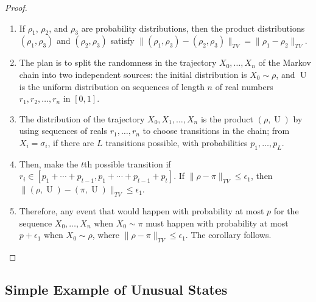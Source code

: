 \documentclass[12pt]{article}
\begin{document}
\begin{example}
\begin{proof}
    \begin{enumerate}
        \item
            If \( \rho_1 \), \( \rho_{2} \), and \( \rho_3 \) are
            probability distributions, then the product distributions \(
            (\rho_1 , \rho_3 ) \) and \( (\rho_2 , \rho_3 ) \) satisfy \(
            \| (\rho_1 , \rho_3 )- (\rho_2, \rho_3 )\|_{TV} = \|\rho_1-
            \rho_2 \|_{TV} \).%
        \item
            The plan is to split the randomness in the trajectory \( X_0,
            \dots , X_n \) of the Markov chain into two independent
            sources:  the initial distribution is \( X_0 \sim \rho \),
            and \(
            \operatorname{U}
            \) is the uniform distribution on sequences of length \( n \)
            of real numbers \( r_1 , r_2, \dots, r_n \) in \( [0, 1] \).
        \item
            The distribution of the trajectory \( X_0 , X_1,\dots, X_n \)
            is the product \( (\rho,
            \operatorname{U}
            ) \) by using sequences of reals \( r_1, \dots, r_n \) to
            choose transitions in the chain; from \( X_i = \sigma_i \),
            if there are \( L \) transitions possible, with
            probabilities \( p_1, \dots, p_L \).
        \item
            Then, make the \( t \)th possible transition if \( r_i \in [p_1
            + \cdots + p_{t-1}, p_1 + \cdots + p_{t-1 }+ p_t] \).  If \(
            \|\rho- \pi\|_{TV} \le \epsilon_1 \), then \( \|(\rho,
            \operatorname{U}
            )- (\pi,
            \operatorname{U}
            )\|_{TV} \le \epsilon_1 \).
        \item
            Therefore, any event that would happen with probability at
            most \( p \) for the sequence \( X_0 ,\dots, X_n \) when \(
            X_0 \sim \pi \) must happen with probability at most \( p +
            \epsilon_1 \) when \( X_0 \sim \rho \), where \( \|\rho- \pi\|_
            {TV} \le \epsilon_1 \).  The corollary follows.
    \end{enumerate}
\end{proof}

\subsection*{Simple Example of Unusual States}


\end{example}
\end{document}
